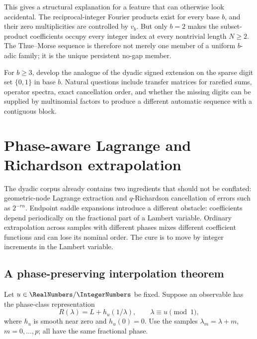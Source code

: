 \documentclass[11pt]{article}
\numberwithin{equation}{section}
\theoremstyle{definition}
\theoremstyle{remark}
\begin{document}
This gives a structural explanation for a feature that can otherwise look accidental.  The
reciprocal-integer Fourier products exist for every base $b$, and their zero multiplicities
are controlled by $v_b$.  But only $b=2$ makes the subset-product coefficients occupy every
integer index at every nontrivial length $N\ge2$.  The Thue--Morse sequence is therefore not
merely one member of a uniform $b$-adic family; it is the unique persistent no-gap member.

\begin{problem}
For $b\ge3$, develop the analogue of the dyadic signed extension on the sparse digit set
$\{0,1\}$ in base $b$.  Natural questions include transfer matrices for rarefied sums,
operator spectra, exact cancellation order, and whether the missing digits can be supplied by
multinomial factors to produce a different automatic sequence with a contiguous block.
\end{problem}

\section{Phase-aware Lagrange and Richardson extrapolation}
\label{p10:sec:phase}

The dyadic corpus already contains two ingredients that should not be conflated:
geometric-node Lagrange extraction and $q$-Richardson cancellation of errors such as
$2^{-rn}$.  Endpoint saddle expansions introduce a different obstacle: coefficients depend
periodically on the fractional part of a Lambert variable.  Ordinary extrapolation across
samples with different phases mixes different coefficient functions and can lose its nominal
order.  The cure is to move by integer increments in the Lambert variable.

\subsection{A phase-preserving interpolation theorem}

Let $u\in\RealNumbers/\IntegerNumbers$ be fixed.  Suppose an observable has the phase-class representation
\begin{equation}
 R(\lambda)=L+h_u(1/\lambda),
 \qquad \lambda\equiv u\pmod1,                               \label{p10:eq:phase-model}
\end{equation}
where $h_u$ is smooth near zero and $h_u(0)=0$.  Use the samples
$\lambda_m=\lambda+m$, $m=0,\ldots,p$; all have the same fractional phase.
\end{document}
